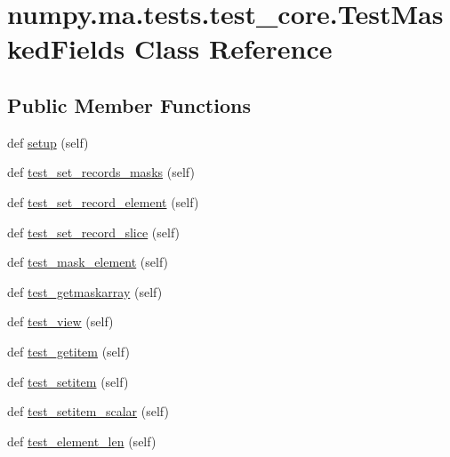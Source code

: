 \hypertarget{classnumpy_1_1ma_1_1tests_1_1test__core_1_1TestMaskedFields}{}\section{numpy.\+ma.\+tests.\+test\+\_\+core.\+Test\+Masked\+Fields Class Reference}
\label{classnumpy_1_1ma_1_1tests_1_1test__core_1_1TestMaskedFields}
\subsection*{Public Member Functions}
\begin{DoxyCompactItemize}
\item 
def \hyperlink{classnumpy_1_1ma_1_1tests_1_1test__core_1_1TestMaskedFields_a4980046c6adbba41cddfdafd5522a4f6}{setup} (self)
\item 
def \hyperlink{classnumpy_1_1ma_1_1tests_1_1test__core_1_1TestMaskedFields_ac2dfe8049d51c5f65f29a9d6251e818d}{test\+\_\+set\+\_\+records\+\_\+masks} (self)
\item 
def \hyperlink{classnumpy_1_1ma_1_1tests_1_1test__core_1_1TestMaskedFields_a1801c329823d28637035e8ce43fbe76c}{test\+\_\+set\+\_\+record\+\_\+element} (self)
\item 
def \hyperlink{classnumpy_1_1ma_1_1tests_1_1test__core_1_1TestMaskedFields_a798c946ff460e17843e271ba40521226}{test\+\_\+set\+\_\+record\+\_\+slice} (self)
\item 
def \hyperlink{classnumpy_1_1ma_1_1tests_1_1test__core_1_1TestMaskedFields_a13c6e8ccc2c513bbfbb1af0bbb2045cf}{test\+\_\+mask\+\_\+element} (self)
\item 
def \hyperlink{classnumpy_1_1ma_1_1tests_1_1test__core_1_1TestMaskedFields_a8814fc11be463e5b060a4b3fc5f33361}{test\+\_\+getmaskarray} (self)
\item 
def \hyperlink{classnumpy_1_1ma_1_1tests_1_1test__core_1_1TestMaskedFields_aa7e855336c55c6c1cc7a4b0fe0f7a07b}{test\+\_\+view} (self)
\item 
def \hyperlink{classnumpy_1_1ma_1_1tests_1_1test__core_1_1TestMaskedFields_afdd956f7b8d413de107732ed51d4df1a}{test\+\_\+getitem} (self)
\item 
def \hyperlink{classnumpy_1_1ma_1_1tests_1_1test__core_1_1TestMaskedFields_a4d770807ef0f8290823a97cf25019453}{test\+\_\+setitem} (self)
\item 
def \hyperlink{classnumpy_1_1ma_1_1tests_1_1test__core_1_1TestMaskedFields_abe6ce6be1358793e7012e15e5ee76378}{test\+\_\+setitem\+\_\+scalar} (self)
\item 
def \hyperlink{classnumpy_1_1ma_1_1tests_1_1test__core_1_1TestMaskedFields_a89c5dad88288f4133c39d69f1fdfdc16}{test\+\_\+element\+\_\+len} (self)
\end{DoxyCompactItemize}
